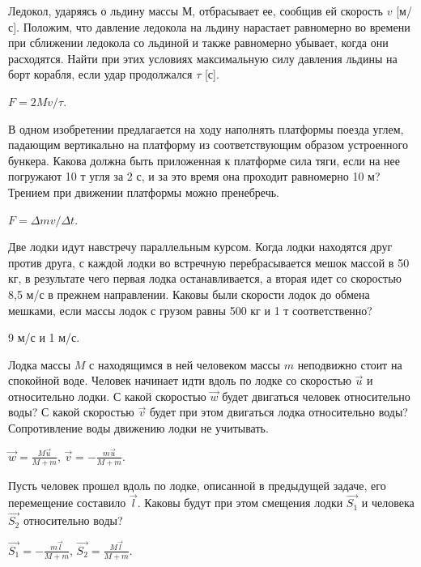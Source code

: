\begin{ex} %
Ледокол, ударяясь о льдину массы $М$, отбрасывает ее, сообщив ей скорость $v$ [м/с]. Положим, что давление ледокола на льдину нарастает равномерно во времени при сближении ледокола со льдиной и также равномерно убывает, когда они расходятся. Найти при этих условиях максимальную силу давления льдины на борт корабля, если удар продолжался $\tau$ [с].
\begin{ans}
$F = 2Mv/\tau$.
\end{ans}
\end{ex}

\begin{ex} %
В одном изобретении предлагается на ходу наполнять платформы поезда углем, падающим вертикально на платформу из соответствующим образом устроенного бункера. Какова должна быть приложенная к платформе сила тяги, если на нее погружают 10 т угля за 2 с, и за это время она проходит равномерно 10 м? Трением при движении платформы можно пренебречь.
\begin{ans}
$F = \Delta m v/ \Delta t$.
\end{ans}
\end{ex}

\begin{ex} %
Две лодки идут навстречу параллельным курсом. Когда лодки находятся друг против друга, с каждой лодки во встречную перебрасывается мешок массой в 50 кг, в результате чего первая лодка останавливается, а вторая идет со скоростью 8,5 м/с в прежнем направлении. Каковы были скорости лодок до обмена мешками, если массы лодок с грузом равны 500 кг и 1 т соответственно?
\begin{ans}
9 м/с и 1 м/с.
\end{ans}
\end{ex}

\begin{ex} %
Лодка массы $M$ с находящимся в ней человеком массы $m$ неподвижно стоит на спокойной воде. Человек начинает идти вдоль по лодке со скоростью $\vec{u}$ и относительно лодки. С какой скоростью $\vec{w}$ будет двигаться человек относительно воды? С какой скоростью $\vec{v}$ будет при этом двигаться лодка относительно воды? Сопротивление воды движению лодки не учитывать.
\begin{ans}
$\vec{w} = \frac{M\vec{u}}{M+m}$, $\vec{v} = -\frac{m\vec{u}}{M+m}$.
\end{ans}
\end{ex}

\begin{ex} %
Пусть человек прошел вдоль по лодке, описанной в предыдущей задаче, его перемещение составило $\vec{l}$. Каковы будут при этом смещения лодки $\vec{S_1}$ и человека $\vec{S_2}$ относительно воды?
\begin{ans}
$\vec{S_1} = -\frac{m\vec{l}}{M+m}$, $\vec{S_2} = \frac{M\vec{l}}{M+m}$.
\end{ans}
\end{ex}

